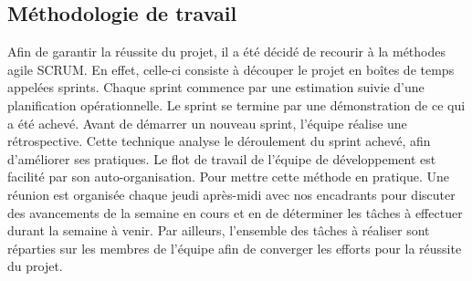	\subsection {Méthodologie de travail }
	Afin de garantir la réussite du projet, il a été décidé de recourir à la méthodes agile SCRUM. En effet, celle-ci consiste à découper le projet en boîtes de temps appelées sprints. Chaque sprint commence par une estimation suivie d'une planification opérationnelle. Le sprint se termine par une démonstration de ce qui a été achevé. Avant de démarrer un nouveau sprint, l'équipe réalise une rétrospective. Cette technique analyse le déroulement du sprint achevé, afin d'améliorer ses pratiques. Le flot de travail de l'équipe de développement est facilité par son auto-organisation. 
	Pour mettre cette méthode en pratique. Une réunion est organisée chaque jeudi après-midi avec nos encadrants pour discuter des avancements de la semaine en cours et en de déterminer les tâches à effectuer durant la semaine à venir. Par ailleurs, l’ensemble des tâches à réaliser sont réparties sur les membres de l’équipe afin de converger les efforts pour la réussite du projet. 
	
